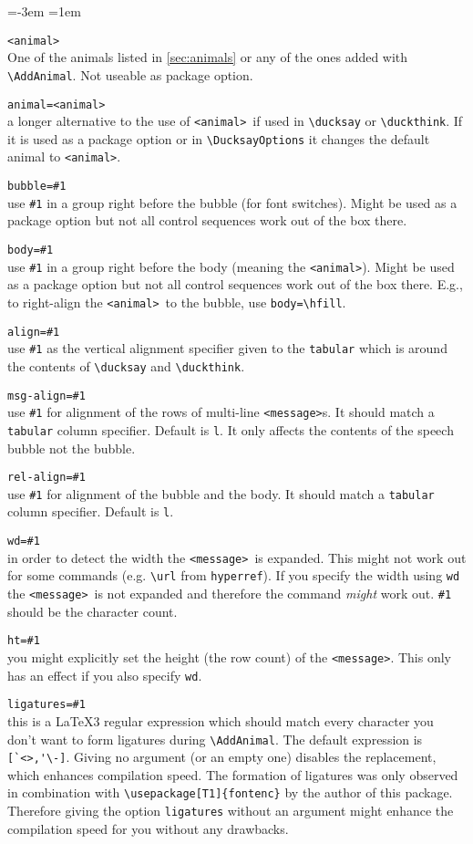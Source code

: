 \documentclass[a4paper,10pt]{article}
\newcommand*{\anml}{\texttt{<animal>}}
\newcommand*{\msg}{\texttt{<message>}}
\newenvironment{codedescription}{%
  \parindent=-3em
  \parskip=1em
  \par
}{}
\begin{document}
\begin{codedescription}
\anml\\
  One of the animals listed in \autoref{sec:animals} or any of the ones added
  with \verb|\AddAnimal|. Not useable as package option.

\texttt{animal=\anml}\\
  a longer alternative to the use of \anml\ if used in \verb|\ducksay| or
  \verb|\duckthink|. If it is used as a package option or in
  \verb|\DucksayOptions| it changes the default animal to \anml.

\texttt{bubble=\#1}\\
  use \texttt{\#1} in a group right before the bubble (for font switches). Might
  be used as a package option but not all control sequences work out of the box
  there.

\texttt{body=\#1}\\
  use \texttt{\#1} in a group right before the body (meaning the \anml). Might
  be used as a package option but not all control sequences work out of the box
  there. E.g., to right-align the \anml\ to the bubble, use \verb|body=\hfill|.

\texttt{align=\#1}\\
  use \texttt{\#1} as the vertical alignment specifier given to the
  \texttt{tabular} which is around the contents of \verb|\ducksay| and
  \verb|\duckthink|.

\texttt{msg-align=\#1}\\
  use \texttt{\#1} for alignment of the rows of multi-line \msg s. It should
  match a \texttt{tabular} column specifier. Default is \texttt{l}. It only
  affects the contents of the speech bubble not the bubble.

\texttt{rel-align=\#1}\\
  use \texttt{\#1} for alignment of the bubble and the body. It should match a
  \texttt{tabular} column specifier. Default is \texttt{l}.

\texttt{wd=\#1}\\
  in order to detect the width the \msg\ is expanded. This might not work out
  for some commands (e.g. \verb|\url| from \texttt{hyperref}). If you specify
  the width using \texttt{wd} the \msg\ is not expanded and therefore the
  command \emph{might} work out. \texttt{\#1} should be the character count.

\texttt{ht=\#1}\\
  you might explicitly set the height (the row count) of the \msg. This only has
  an effect if you also specify \texttt{wd}.

\texttt{ligatures=\#1}\\
  this is a \LaTeX3 regular expression which should match every character you
  don't want to form ligatures during \verb|\AddAnimal|. The default expression
  is \verb|[`<>,'\-]|. Giving no argument (or an empty one) disables the
  replacement, which enhances compilation speed. The formation of ligatures was
  only observed in combination with \verb|\usepackage[T1]{fontenc}| by the
  author of this package. Therefore giving the option \texttt{ligatures} without
  an argument might enhance the compilation speed for you without any
  drawbacks.
\end{codedescription}
\end{document}
